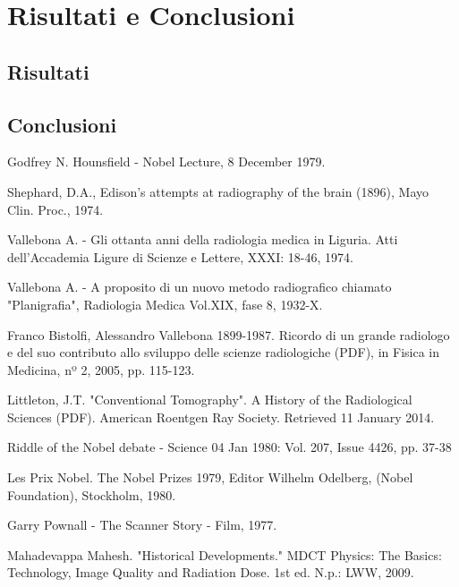 \documentclass[a4paper,12pt, doubleside]{report}
\begin{document}
    \chapter{Risultati e Conclusioni}
        \section{Risultati}
        \section{Conclusioni}



\newpage
\begin{thebibliography}{1}
    
        Godfrey N. Hounsfield - Nobel Lecture, 8 December 1979.
    
        Shephard, D.A., Edison's attempts at radiography of the brain (1896), Mayo Clin. Proc., 1974.
    
        Vallebona A. - Gli ottanta anni della radiologia medica in Liguria. Atti dell’Accademia Ligure di Scienze e Lettere, XXXI: 18-46, 1974.
      
        Vallebona A. - A proposito di un nuovo metodo radiografico chiamato "Planigrafia", Radiologia Medica Vol.XIX, fase 8, 1932-X.
    
        Franco Bistolfi, Alessandro Vallebona 1899-1987. Ricordo di un grande radiologo e del suo contributo allo sviluppo delle scienze radiologiche (PDF), in Fisica in Medicina, nº 2, 2005, pp. 115-123.  
    
        Littleton, J.T. "Conventional Tomography". A History of the Radiological Sciences (PDF). American Roentgen Ray Society. Retrieved 11 January 2014.
    
        Riddle of the Nobel debate - Science 04 Jan 1980: Vol. 207, Issue 4426, pp. 37-38
    
        Les Prix Nobel. The Nobel Prizes 1979, Editor Wilhelm Odelberg, (Nobel Foundation), Stockholm, 1980. 
    
        Garry Pownall - The Scanner Story - Film, 1977.
    
        Mahadevappa Mahesh. "Historical Developments." MDCT Physics: The Basics: Technology, Image Quality and Radiation Dose. 1st ed. N.p.: LWW, 2009.
    

\end{thebibliography}
\end{document}
